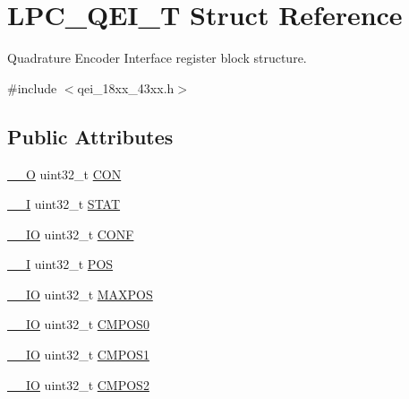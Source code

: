 \hypertarget{struct_l_p_c___q_e_i___t}{}\section{L\+P\+C\+\_\+\+Q\+E\+I\+\_\+T Struct Reference}
\label{struct_l_p_c___q_e_i___t}


Quadrature Encoder Interface register block structure.  




{\ttfamily \#include $<$qei\+\_\+18xx\+\_\+43xx.\+h$>$}

\subsection*{Public Attributes}
\begin{DoxyCompactItemize}
\item 
\hyperlink{core__sc300_8h_a7e25d9380f9ef903923964322e71f2f6}{\+\_\+\+\_\+O} uint32\+\_\+t \hyperlink{struct_l_p_c___q_e_i___t_af84cacebc1e4ba309cb8c1af4acca96f}{C\+ON}
\item 
\hyperlink{core__sc300_8h_af63697ed9952cc71e1225efe205f6cd3}{\+\_\+\+\_\+I} uint32\+\_\+t \hyperlink{struct_l_p_c___q_e_i___t_a842c67512c5c8c9a31e7ba2ec4771784}{S\+T\+AT}
\item 
\hyperlink{core__sc300_8h_aec43007d9998a0a0e01faede4133d6be}{\+\_\+\+\_\+\+IO} uint32\+\_\+t \hyperlink{struct_l_p_c___q_e_i___t_a72886edbac2779ab5e2823fd0db339f7}{C\+O\+NF}
\item 
\hyperlink{core__sc300_8h_af63697ed9952cc71e1225efe205f6cd3}{\+\_\+\+\_\+I} uint32\+\_\+t \hyperlink{struct_l_p_c___q_e_i___t_a400314449370eff087c3c5e1e1c31cc1}{P\+OS}
\item 
\hyperlink{core__sc300_8h_aec43007d9998a0a0e01faede4133d6be}{\+\_\+\+\_\+\+IO} uint32\+\_\+t \hyperlink{struct_l_p_c___q_e_i___t_acaf54ed95adb4553f8be314b509f786b}{M\+A\+X\+P\+OS}
\item 
\hyperlink{core__sc300_8h_aec43007d9998a0a0e01faede4133d6be}{\+\_\+\+\_\+\+IO} uint32\+\_\+t \hyperlink{struct_l_p_c___q_e_i___t_a4bb72cc566919075cb721bb123e72443}{C\+M\+P\+O\+S0}
\item 
\hyperlink{core__sc300_8h_aec43007d9998a0a0e01faede4133d6be}{\+\_\+\+\_\+\+IO} uint32\+\_\+t \hyperlink{struct_l_p_c___q_e_i___t_ad1272dc00c77777af8e58d6ac3b94902}{C\+M\+P\+O\+S1}
\item 
\hyperlink{core__sc300_8h_aec43007d9998a0a0e01faede4133d6be}{\+\_\+\+\_\+\+IO} uint32\+\_\+t \hyperlink{struct_l_p_c___q_e_i___t_aa2f3bddd189d57b8985ffca9ddb70ff2}{C\+M\+P\+O\+S2}

\end{DoxyCompactItemize}
